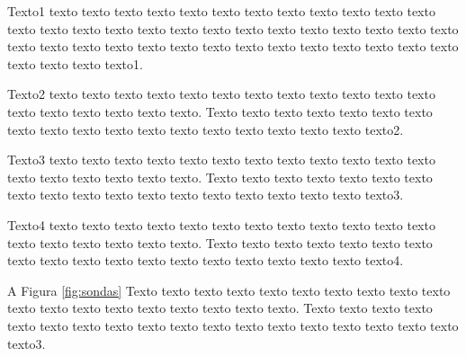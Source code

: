 	\begin{figure}[h!] 
   	    \captionsetup{width=16cm}%
	\end{figure}
	
    Texto1 texto texto texto texto texto texto texto texto texto texto texto texto texto texto texto texto texto texto texto texto texto texto texto texto texto texto texto texto texto texto texto texto texto texto texto texto texto texto texto texto texto texto texto texto1.

    Texto2 texto texto texto texto texto texto texto texto texto texto texto texto texto texto texto texto texto texto. Texto texto texto texto texto texto texto texto texto texto texto texto texto texto texto texto texto texto texto2.

    Texto3 texto texto texto texto texto texto texto texto texto texto texto texto texto texto texto texto texto texto. Texto texto texto texto texto texto texto texto texto texto texto texto texto texto texto texto texto texto texto3.

    Texto4 texto texto texto texto texto texto texto texto texto texto texto texto texto texto texto texto texto texto. Texto texto texto texto texto texto texto texto texto texto texto texto texto texto texto texto texto texto texto4.

    A Figura \ref{fig:sondas} Texto texto texto texto texto texto texto texto texto texto texto texto texto texto texto texto texto texto texto. Texto texto texto texto texto texto texto texto texto texto texto texto texto texto texto texto texto texto texto3.

